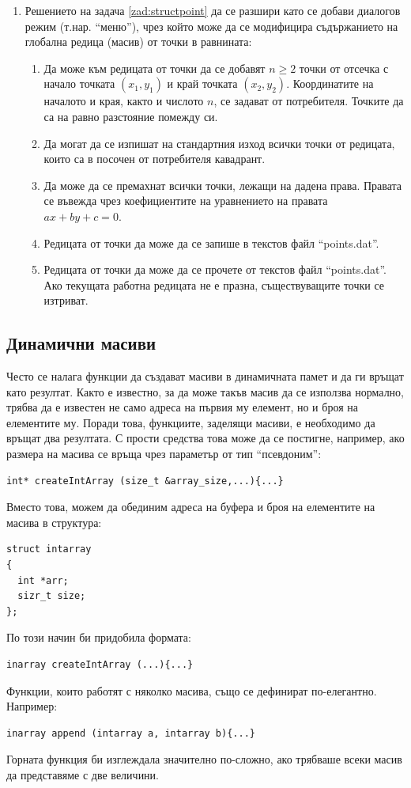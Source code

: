 {\begin{enumerate}[resume]
\item Решението на задача \ref{zad:structpoint} да се разшири като се добави диалогов режим (т.нар. ``меню''), чрез който може да се модифицира съдържанието на глобална редица (масив) от точки в равнината:
\begin{enumerate}[label=\alph*)]
  \item Да може към редицата от точки да се добавят $n \geq 2$ точки от отсечка с начало точката $(x_1,y_1)$ и край точката $(x_2,y_2)$. Координатите на началото и края, както и числото $n$, се задават от потребителя. Точките да са на равно разстояние помежду си.
  \item Да могат да се изпишат на стандартния изход всички точки от редицата, които са в посочен от потребителя кавадрант.
  \item Да може да се премахнат всички точки, лежащи на дадена права. Правата се въвежда чрез коефициентите на уравнението на правата $ax + by + c=0$.
  \item Редицата от точки да може да се запише в текстов файл ``points.dat''.
  \item Редицата от точки да може да се прочете от текстов файл ``points.dat''. Ако текущата работна редицата не е празна, съществуващите точки се изтриват.

\end{enumerate}
\end{enumerate}

\subsection {Динамични масиви}

\begin{mdframed}[hidealllines=true,backgroundcolor=gray!20]
Често се налага функции да създават масиви в динамичната памет и да ги връщат като резултат. Както е известно, за да може такъв масив да се използва нормално, трябва да е известен не само адреса на първия му елемент, но и броя на елементите му. Поради това, функциите, заделящи масиви, е необходимо да връщат два резултата. С прости средства това може да се постигне, например, ако размера на масива се връща чрез параметър от тип ``псевдоним'':
\begin{verbatim}
int* createIntArray (size_t &array_size,...){...}  
\end{verbatim}
Вместо това, можем да обединим адреса на буфера и броя на елементите на масива в структура:
\begin{verbatim}
struct intarray
{
  int *arr;
  sizr_t size;  
};
\end{verbatim}
По този начин  би придобила формата:
\begin{verbatim}
inarray createIntArray (...){...}  
\end{verbatim}
Функции, които работят с няколко масива, също се дефинират по-елегантно. Например: 
\begin{verbatim}
inarray append (intarray a, intarray b){...}
\end{verbatim}
Горната функция би изглеждала значително по-сложно, ако трябваше всеки масив да представяме с две величини.
\end{mdframed}

}
